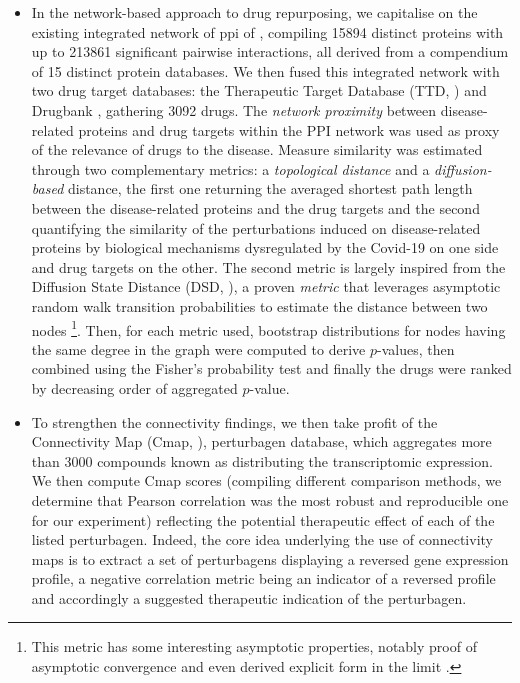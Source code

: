 {\begin{itemize}
\item In the network-based approach to drug repurposing, we capitalise on the existing integrated network of \acrshort{ppi} of \autocite{cheng_etal19}, compiling \num{15894} distinct proteins with up to \num{213861} significant pairwise interactions, all derived from a compendium of 15 distinct protein databases. We then fused this integrated network with two drug target databases:  the Therapeutic Target Database (TTD, \autocite{chen_etal02}) and Drugbank \autocite {wishart_etal08}, gathering \num{3092} drugs. The \emph{network proximity} between disease-related proteins and drug targets within the PPI network was used as proxy of the relevance of drugs to the disease. Measure similarity was estimated through two complementary metrics: a \emph{topological distance} and a \emph{diffusion-based} distance, the first one returning the averaged shortest path length between the disease-related proteins and the drug targets and the second quantifying the similarity of the perturbations induced on disease-related proteins by biological mechanisms dysregulated by the Covid-19 on one side and drug targets on the other. The second metric is largely inspired from the Diffusion State Distance (DSD, \autocite{cao_etal13}), a proven \emph{metric} \autocite[Lemma 1]{cao_etal13} that leverages asymptotic random walk transition probabilities to estimate the distance between two nodes \footnote{This metric has some interesting asymptotic properties, notably proof of asymptotic convergence \autocite[Lemma 2]{cao_etal13} and even derived explicit form in the limit \autocite[Claims 2 and 3]{cao_etal13}.}. Then, for each metric used, bootstrap distributions for nodes having the same degree in the graph were computed to derive $p$-values, then combined using the Fisher's probability test and finally the drugs were ranked by decreasing order of aggregated $p$-value.

\item To strengthen the connectivity findings, we then take profit of the Connectivity Map (Cmap, \autocite{lamb_etal06}), perturbagen database, which aggregates more than \num{3000} compounds known as distributing the transcriptomic expression. We then compute Cmap scores (compiling different comparison methods, we determine that Pearson correlation was the most robust and reproducible one for our experiment) reflecting the potential therapeutic effect of each of the listed perturbagen. Indeed, the core idea underlying the use of connectivity maps is to extract a set of perturbagens displaying a reversed gene expression profile, a negative correlation metric being an indicator of a reversed profile and accordingly a suggested therapeutic indication of the perturbagen.
\end{itemize} 
}

